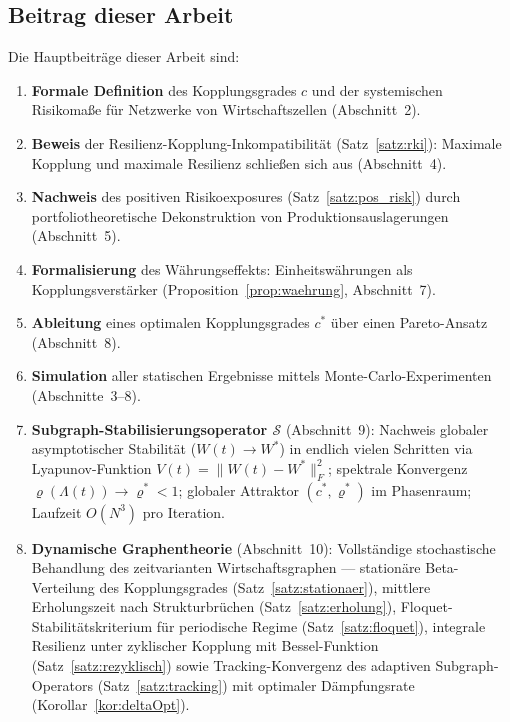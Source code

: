 \documentclass[a4paper, 12pt, twoside, openright]{report}
\theoremstyle{definition}
\theoremstyle{definition}
\begin{document}
\subsection{Beitrag dieser Arbeit}

Die Hauptbeiträge dieser Arbeit sind:

\begin{enumerate}
    \item \textbf{Formale Definition} des Kopplungsgrades $c$ und der systemischen Risikomaße
          für Netzwerke von Wirtschaftszellen (Abschnitt~2).
    \item \textbf{Beweis} der Resilienz-Kopplung-Inkompatibilität (Satz~\ref{satz:rki}):
          Maximale Kopplung und maximale Resilienz schließen sich aus (Abschnitt~4).
    \item \textbf{Nachweis} des positiven Risikoexposures (Satz~\ref{satz:pos_risk}) durch
          portfoliotheoretische Dekonstruktion von Produktionsauslagerungen (Abschnitt~5).
    \item \textbf{Formalisierung} des Währungseffekts: Einheitswährungen als
          Kopplungsverstärker (Proposition~\ref{prop:waehrung}, Abschnitt~7).
    \item \textbf{Ableitung} eines optimalen Kopplungsgrades $c^*$ über einen
          Pareto-Ansatz (Abschnitt~8).
    \item \textbf{Simulation} aller statischen Ergebnisse mittels Monte-Carlo-Experimenten
          (Abschnitte~3--8).
    \item \textbf{Subgraph-Stabilisierungsoperator $\mathcal{S}$} (Abschnitt~9):
          Nachweis globaler asymptotischer Stabilität ($W(t)\to W^*$) in endlich vielen
          Schritten via Lyapunov-Funktion $V(t)=\|W(t)-W^*\|_F^2$; spektrale Konvergenz
          $\varrho(\Lambda(t))\to\varrho^*<1$; globaler Attraktor $(c^*,\varrho^*)$
          im Phasenraum; Laufzeit $O(N^3)$ pro Iteration.
    \item \textbf{Dynamische Graphentheorie} (Abschnitt~10): Vollständige stochastische
          Behandlung des zeitvarianten Wirtschaftsgraphen --- stationäre Beta-Verteilung
          des Kopplungsgrades (Satz~\ref{satz:stationaer}), mittlere Erholungszeit nach
          Strukturbrüchen (Satz~\ref{satz:erholung}), Floquet-Stabilitätskriterium für
          periodische Regime (Satz~\ref{satz:floquet}), integrale Resilienz unter
          zyklischer Kopplung mit Bessel-Funktion (Satz~\ref{satz:rezyklisch}) sowie
          Tracking-Konvergenz des adaptiven Subgraph-Operators (Satz~\ref{satz:tracking})
          mit optimaler Dämpfungsrate (Korollar~\ref{kor:deltaOpt}).
\end{enumerate}
\end{document}
